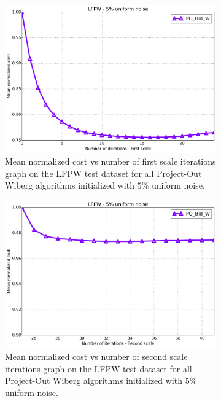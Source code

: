 \begin{figure}[h!]
\begin{subfigure}{0.48\textwidth}
	\end{subfigure}
	\par\medskip
	\begin{subfigure}{0.48\textwidth}
	    \includegraphics[width=\textwidth]{experiments/algorithms/po_w/mean_cost_vs_iters1_po_w_5.png}
	    \caption{Mean normalized cost vs number of first scale iterations graph on the LFPW test dataset for all Project-Out Wiberg algorithms initialized with $5\%$ uniform noise.}
	    \label{fig:mean_cost_vs_iters1_po_w_5}
	\end{subfigure}
	\hfill
	\begin{subfigure}{0.48\textwidth}
	    \includegraphics[width=\textwidth]{experiments/algorithms/po_w/mean_cost_vs_iters2_po_w_5.png}
	    \caption{Mean normalized cost vs number of second scale iterations graph on the LFPW test dataset for all Project-Out Wiberg algorithms initialized with $5\%$ uniform noise.}
	    \label{fig:mean_cost_vs_iters2_po_w_5}
	\end{subfigure}
	\label{fig:po_w_5}
	\caption{}
\end{figure}


